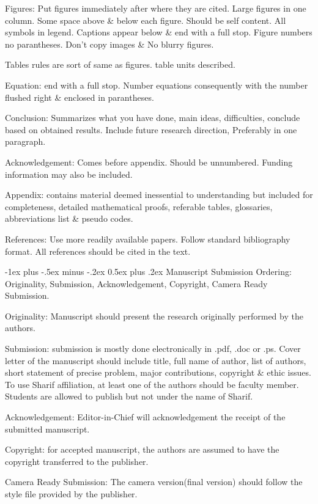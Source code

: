 \documentclass[10pt,landscape]{article}
\makeatletter
\renewcommand{\section}{\@startsection{section}{1}{0mm}%
                                {-1ex plus -.5ex minus -.2ex}%
                                {0.5ex plus .2ex}%
                                {\normalfont\large\bfseries}}
\makeatother
\begin{document}
\begin{multicols*}{3}
Figures: Put figures immediately after where they are cited. Large figures in one column.
Some space above \& below each figure. Should be self content. All symbols in legend.
Captions appear below \& end with a full stop. Figure numbers no parantheses.
Don't copy images \& No blurry figures.

Tables rules are sort of same as figures.
table units described.

Equation: end with a full stop. Number equations consequently with the number flushed right \&
enclosed in parantheses.

Conclusion: Summarizes what you have done, main ideas, difficulties, conclude based on obtained results.
Include future research direction, Preferably in one paragraph.

Acknowledgement: Comes before appendix. Should be unnumbered. Funding information may also be included.

Appendix: contains material deemed inessential to understanding but included for 
completeness, detailed mathematical proofs, referable tables, glossaries, abbreviations list \& pseudo codes.

References: Use more readily available papers. Follow standard bibliography format.
All references should be cited in the text.

\section{Manuscript Submission}
Ordering: Originality, Submission, Acknowledgement, Copyright, Camera Ready Submission.

Originality: Manuscript should present the research originally performed by the authors.

Submission: submission is mostly done electronically in .pdf, .doc or .ps.
Cover letter of the manuscript should include title, full name of author, list of authors,
short statement of precise problem, major contributions, copyright \& ethic issues.
To use Sharif affiliation, at least one of the authors should be faculty member.
Students are allowed to publish but not under the name of Sharif. 

Acknowledgement: Editor-in-Chief will acknowledgement the receipt of the submitted manuscript.

Copyright: for accepted manuscript, the authors are assumed to have the copyright transferred to 
the publisher.

Camera Ready Submission: The camera version(final version) should follow the style file provided
by the publisher.


\end{multicols*}
\end{document}

